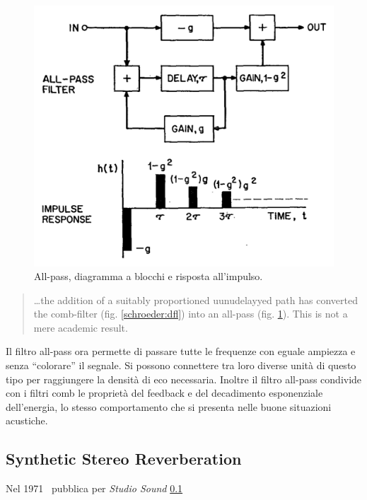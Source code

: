 \begin{refsection}
\begin{figure}[ht]
  \centering
  \includegraphics[width=\textwidth]{CAPITOLI/0500/IMG/allpass.png}
  \caption[]{All-pass, diagramma a blocchi e risposta all'impulso.}
  \label{schroeder:allpass}
\end{figure}

\begin{quote}
  \ldots the addition of a suitably proportioned uunudelayyed path has converted
  the comb-filter (fig. \ref{schroeder:dfl}) into an all-pass (fig.
  \ref{schroeder:allpass}). This is not a mere academic result.
\end{quote}

Il filtro all-pass ora permette di passare tutte le frequenze con eguale ampiezza
e senza “colorare” il segnale. Si possono connettere tra loro diverse unità di
questo tipo per raggiungere la densità di eco necessaria. Inoltre il filtro
all-pass condivide con i filtri comb le proprietà del feedback e del decadimento
esponenziale dell'energia, lo stesso comportamento che si presenta nelle buone
situazioni acustiche.



\subsection{Synthetic Stereo Reverberation}

Nel 1971 \mg~pubblica per \emph{Studio Sound} \ref{} 




\printbibliography
\end{refsection}

